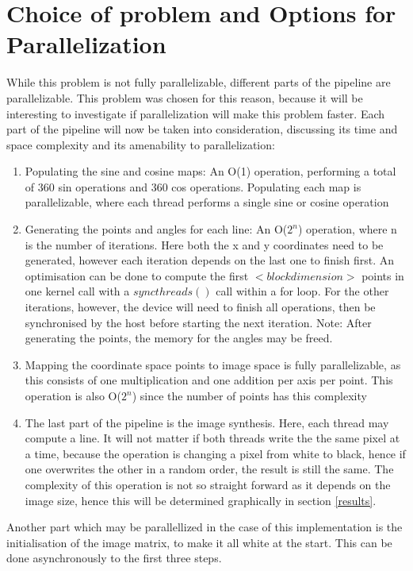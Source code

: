 \section{Choice of problem and Options for Parallelization}
While this problem is not fully parallelizable, different parts of the pipeline are parallelizable. This problem was chosen for this reason, because it will be interesting to investigate if parallelization will make this problem faster. Each part of the pipeline will now be taken into consideration, discussing its time and space complexity and its amenability to parallelization:

\begin{enumerate}
	\item Populating the sine and cosine maps: An O(1) operation, performing a total of 360 sin operations and 360 cos operations. Populating each map is parallelizable, where each thread performs a single sine or cosine operation
	\item Generating the points and angles for each line: An O($2^n$) operation, where n is the number of iterations. Here both the x and y coordinates need to be generated, however each iteration depends on the last one to finish first. An optimisation can be done to compute the first $<block dimension>$ points in one kernel call with a $syncthreads()$ call within a for loop. For the other iterations, however, the device will need to finish all operations, then be synchronised by the host before starting the next iteration. Note: After generating the points, the memory for the angles may be freed.
	\item Mapping the coordinate space points to image space is fully parallelizable, as this consists of one multiplication and one addition per axis per point. This operation is also O($2^n$) since the number of points has this complexity
	\item The last part of the pipeline is the image synthesis. Here, each thread may compute a line. It will not matter if both threads write the the same pixel at a time, because the operation is changing a pixel from white to black, hence if one overwrites the other in a random order, the result is still the same. The complexity of this operation is not so straight forward as it depends on the image size, hence this will be determined graphically in section \ref{results}.
\end{enumerate}

Another part which may be parallellized in the case of this implementation is the initialisation of the image matrix, to make it all white at the start. This can be done asynchronously to the first three steps.

